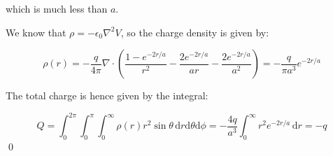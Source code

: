 \documentclass[12pt]{article}
\begin{document}
which is much less than $a$.

We know that $\rho = -\epsilon_{0} \nabla^{2} V$, so the charge density is given by:

\begin{equation}
    \rho(r) = -\frac{q}{4\pi} \nabla \cdot \left( \frac{1 - e^{-2r/a}}{r^{2}} - \frac{2e^{-2r/a}}{ar} - \frac{2e^{-2r/a}}{a^{2}} \right) = -\frac{q}{\pi a^{3}} e^{-2r/a}
\end{equation}

The total charge is hence given by the integral:

\begin{equation}
    Q = \int_{0}^{2\pi} \int_{0}^{\pi} \int_{0}^{\infty} \rho(r) r^{2} \sin{\theta} \, \mathrm{d}r \mathrm{d}\theta \mathrm{d}\phi = -\frac{4q}{a^{3}} \int_{0}^{\infty} r^{2} e^{-2r/a} \, \mathrm{d}r = -q
\end{equation}
\qed
\end{document}
